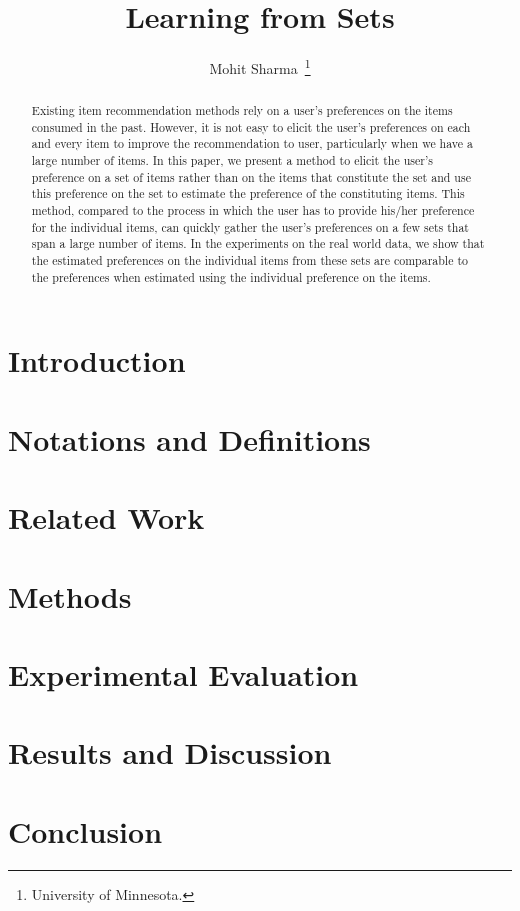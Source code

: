 


\usepackage{sig-alternate-05-2015}




\title{\Large Learning from Sets}
\author{Mohit Sharma~\thanks{University of Minnesota.}}
\date{}
\maketitle

\begin{abstract} \small
Existing item recommendation methods rely on a user's preferences on the items
consumed in the past. However, it is not easy to elicit the user's preferences
on each and every item to improve the recommendation to user, particularly when
we have a large number of items. In this paper, we present a method to elicit
the user's preference on a set of items rather than on the items that constitute
the set and use this preference on the set to estimate the preference of the
constituting items. This method, compared to the process in which the user has
to provide his/her preference for the individual items, can quickly gather the
user's preferences on a few sets that span a large number of items. In the
experiments on the real world data, we show that the estimated preferences on
the individual items from these sets are comparable to the preferences when
estimated using the individual preference on the items. 


\end{abstract}

\section{Introduction}


\section{Notations and Definitions}


\section{Related Work}


\section{Methods}


\section{Experimental Evaluation}


\section{Results and Discussion}


\section{Conclusion}


{}






